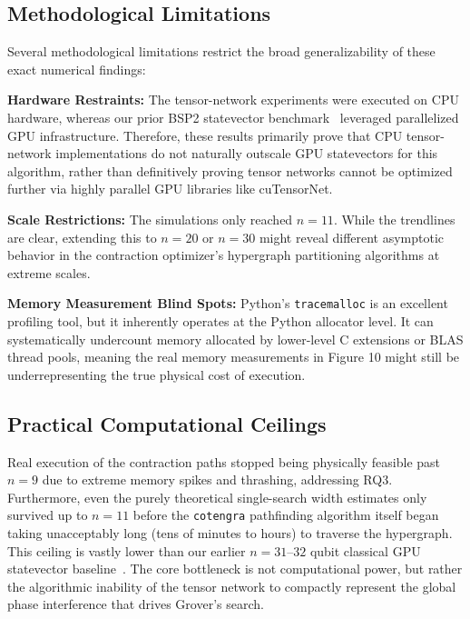 \documentclass[sigconf, authorversion, nonacm]{acmart}
\begin{document}
\subsection{Methodological Limitations}

Several methodological limitations restrict the broad generalizability of these exact numerical findings:

\textbf{Hardware Restraints:} The tensor-network experiments were executed on CPU hardware, whereas our prior BSP2 statevector benchmark~\cite{BSP2Report} leveraged parallelized GPU infrastructure. Therefore, these results primarily prove that CPU tensor-network implementations do not naturally outscale GPU statevectors for this algorithm, rather than definitively proving tensor networks cannot be optimized further via highly parallel GPU libraries like cuTensorNet.

\textbf{Scale Restrictions:} The simulations only reached $n=11$. While the trendlines are clear, extending this to $n=20$ or $n=30$ might reveal different asymptotic behavior in the contraction optimizer's hypergraph partitioning algorithms at extreme scales.

\textbf{Memory Measurement Blind Spots:} Python's \texttt{tracemalloc} is an excellent profiling tool, but it inherently operates at the Python allocator level. It can systematically undercount memory allocated by lower-level C extensions or BLAS thread pools, meaning the real memory measurements in Figure 10 might still be underrepresenting the true physical cost of execution.

\subsection{Practical Computational Ceilings}

Real execution of the contraction paths stopped being physically feasible past $n=9$ due to extreme memory spikes and thrashing, addressing RQ3. Furthermore, even the purely theoretical single-search width estimates only survived up to $n=11$ before the \texttt{cotengra} pathfinding algorithm itself began taking unacceptably long (tens of minutes to hours) to traverse the hypergraph. This ceiling is vastly lower than our earlier $n=31$--$32$ qubit classical GPU statevector baseline~\cite{BSP2Report}. The core bottleneck is not computational power, but rather the algorithmic inability of the tensor network to compactly represent the global phase interference that drives Grover's search.
\end{document}
